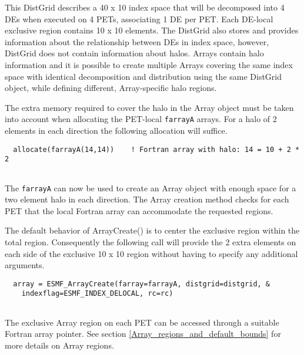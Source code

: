    This DistGrid describes a 40 x 10 index space that will be decomposed into 
   4 DEs when executed on 4 PETs, associating 1 DE per PET. Each DE-local 
   exclusive region contains 10 x 10 elements. The DistGrid also stores and provides
   information about the relationship between DEs in index space, however,
   DistGrid does not contain information about halos. Arrays contain halo 
   information and it is possible to create multiple Arrays covering the same
   index space with identical decomposition and distribution using the same
   DistGrid object, while defining different, Array-specific halo regions.
  
   The extra memory required to cover the halo in the Array object must be 
   taken into account when allocating the PET-local {\tt farrayA} arrays. For
   a halo of 2 elements in each direction the following allocation will suffice. 

 \begin{verbatim}
  allocate(farrayA(14,14))    ! Fortran array with halo: 14 = 10 + 2 * 2
 
\end{verbatim}
 

   The {\tt farrayA} can now be used to create an Array object with enough space
   for a two element halo in each direction. The Array creation method checks for 
   each PET that the local Fortran array can accommodate the requested regions.
  
   The default behavior of ArrayCreate() is to center the exclusive region within
   the total region. Consequently the following call will provide the 2 extra 
   elements on each side of the exclusive 10 x 10 region without having to specify
   any additional arguments. 

 \begin{verbatim}
  array = ESMF_ArrayCreate(farray=farrayA, distgrid=distgrid, &
    indexflag=ESMF_INDEX_DELOCAL, rc=rc)
 
\end{verbatim}
 

   The exclusive Array region on each PET can be accessed through a suitable
   Fortran array pointer. See section \ref{Array_regions_and_default_bounds}
   for more details on Array regions. 

